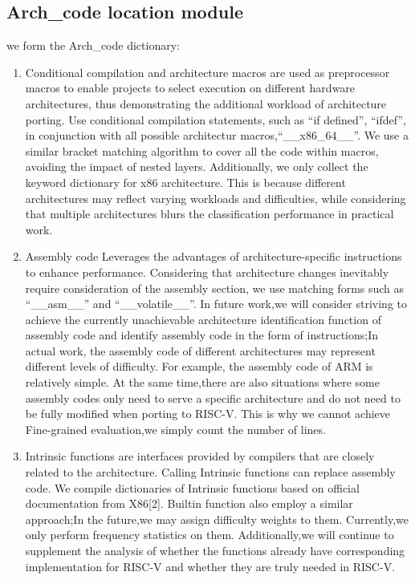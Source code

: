 \documentclass[sigconf,screen,review,anonymous]{acmart}
\begin{document}
\subsection{Arch\_code location module}
we form the Arch\_code dictionary:
\begin{enumerate}
  \item Conditional compilation and architecture macros are used as preprocessor macros to enable projects to select execution on different hardware architectures, thus demonstrating the additional workload of architecture porting.
  Use conditional compilation statements, such as ``if defined'', ``ifdef'', in conjunction with all possible architectur macros,``\_\_x86\_64\_\_''.
  We use a similar bracket matching algorithm to cover all the code within macros, avoiding the impact of nested layers.
  Additionally, we only collect the keyword dictionary for x86 architecture.
  This is because different architectures may reflect varying workloads and difficulties, while considering that multiple architectures blurs the classification performance in practical work.
  \item Assembly code Leverages the advantages of architecture-specific instructions to enhance performance.
  Considering that architecture changes inevitably require consideration of the assembly section, we use matching forms such as ``\_\_asm\_\_'' and ``\_\_volatile\_\_''.
  In future work,we will consider striving to achieve the currently unachievable architecture identification function of assembly code and identify assembly code in the form of instructions;In actual work, the assembly code of different architectures may represent different levels of difficulty.
  For example, the assembly code of ARM is relatively simple.
  At the same time,there are also situations where some assembly codes only need to serve a specific architecture and do not need to be fully modified when porting to RISC-V.
  This is why we cannot achieve Fine-grained evaluation,we simply count the number of lines.
  \item Intrinsic functions are interfaces provided by compilers that are closely related to the architecture.
  Calling Intrinsic functions can replace assembly code.
  We compile dictionaries of Intrinsic functions based on official documentation from X86[2].
  Builtin function also employ a similar approach;In the future,we may assign difficulty weights to them.
  Currently,we only perform frequency statistics on them.
  Additionally,we will continue to supplement the analysis of whether the functions already have corresponding implementation for RISC-V and whether they are truly needed in RISC-V.

\end{enumerate}
\end{document}
